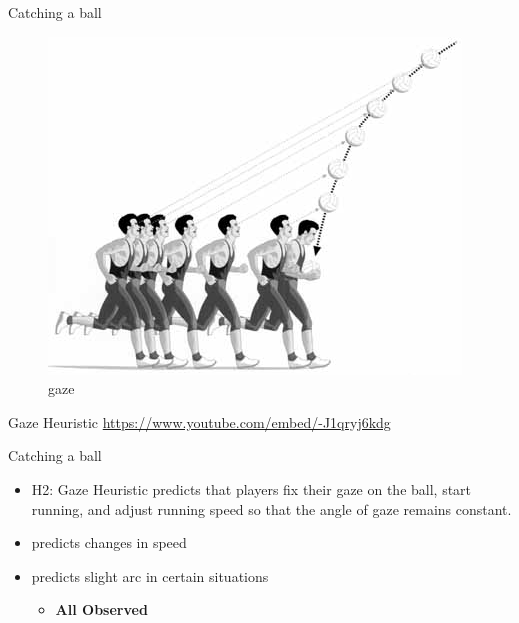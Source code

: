 \documentclass[
  ignorenonframetext,
]{beamer}
\providecommand{\tightlist}{%
  \setlength{\itemsep}{0pt}\setlength{\parskip}{0pt}}\usepackage{longtable,booktabs,array}
\begin{document}
\begin{frame}{Catching a ball}
\protect\hypertarget{catching-a-ball-1}{}
\begin{figure}

{\centering \includegraphics{resources/images/gaze.jpg}

}

\caption{gaze}

\end{figure}
\end{frame}

\begin{frame}{Gaze Heuristic}
\protect\hypertarget{gaze-heuristic-1}{}
\url{https://www.youtube.com/embed/-J1qryj6kdg}
\end{frame}

\begin{frame}{Catching a ball}
\protect\hypertarget{catching-a-ball-2}{}
\begin{itemize}
\tightlist
\item
  H2: Gaze Heuristic predicts that players fix their gaze on the ball,
  start running, and adjust running speed so that the angle of gaze
  remains constant.
\item
  predicts changes in speed
\item
  predicts slight arc in certain situations

  \begin{itemize}
  \tightlist
  \item
    \textbf{All Observed}
  \end{itemize}
\end{itemize}
\end{frame}
\end{document}
